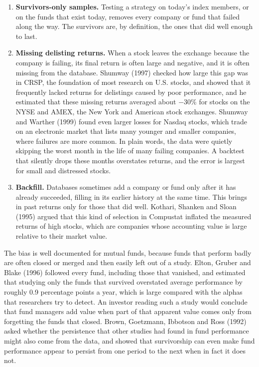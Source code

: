 \begin{enumerate}
  \item \textbf{Survivors-only samples.} Testing a strategy on today's index members, or on the funds that exist today, removes every company or fund that failed along the way. The survivors are, by definition, the ones that did well enough to last.
  \item \textbf{Missing delisting returns.} When a stock leaves the exchange because the company is failing, its final return is often large and negative, and it is often missing from the database. Shumway (1997) checked how large this gap was in CRSP, the foundation of most research on U.S. stocks, and showed that it frequently lacked returns for delistings caused by poor performance, and he estimated that these missing returns averaged about $-30$\% for stocks on the NYSE and AMEX, the New York and American stock exchanges. Shumway and Warther (1999) found even larger losses for Nasdaq stocks, which trade on an electronic market that lists many younger and smaller companies, where failures are more common. In plain words, the data were quietly skipping the worst month in the life of many failing companies. A backtest that silently drops these months overstates returns, and the error is largest for small and distressed stocks.
  \item \textbf{Backfill.} Databases sometimes add a company or fund only after it has already succeeded, filling in its earlier history at the same time. This  brings in past returns only for those that did well. Kothari, Shanken and Sloan (1995) argued that this kind of selection in Compustat inflated the measured returns of high  stocks, which are companies whose accounting value is large relative to their market value.
\end{enumerate}

The bias is well documented for mutual funds, because funds that perform badly are often closed or merged and then easily left out of a study. Elton, Gruber and Blake (1996) followed every fund, including those that vanished, and estimated that studying only the funds that survived overstated average performance by roughly 0.9 percentage points a year, which is large compared with the alphas that researchers try to detect. An investor reading such a study would conclude that fund managers add value when part of that apparent value comes only from forgetting the funds that closed. Brown, Goetzmann, Ibbotson and Ross (1992) asked whether the persistence that other studies had found in fund performance might also come from the data, and showed that survivorship can even make fund performance appear to persist from one period to the next when in fact it does not.

